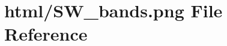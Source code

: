 \hypertarget{_s_w__bands_8png}{}\section{html/\+S\+W\+\_\+bands.png File Reference}
\label{_s_w__bands_8png}
